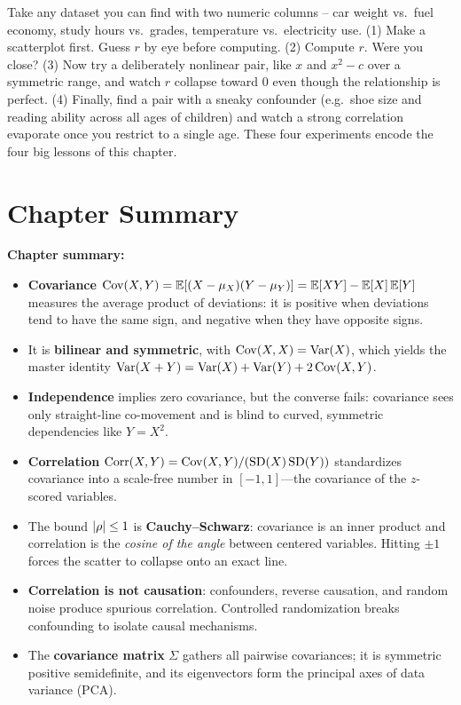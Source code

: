 \begin{labbox}
Take any dataset you can find with two numeric columns -- car weight vs.\ fuel
economy, study hours vs.\ grades, temperature vs.\ electricity use. (1) Make a
scatterplot first. Guess $r$ by eye before computing. (2) Compute $r$. Were you
close? (3) Now try a deliberately nonlinear pair, like $x$ and $x^2 - c$ over
a symmetric range, and watch $r$ collapse toward $0$ even though the relationship is
perfect. (4) Finally, find a pair with a sneaky confounder (e.g.\ shoe size and
reading ability across all ages of children) and watch a strong correlation
evaporate once you restrict to a single age. These four experiments encode the four
big lessons of this chapter.
\end{labbox}

\section{Chapter Summary}
\label{ch14:summary}

\begin{recoverybox}
\textbf{Chapter summary:}
\begin{itemize}
\item \textbf{Covariance} $\operatorname{Cov}(X,Y) = \operatorname{\mathbb{E}}[(X-\mu_X)(Y-\mu_Y)] = \operatorname{\mathbb{E}}[XY] - \operatorname{\mathbb{E}}[X]\operatorname{\mathbb{E}}[Y]$ measures the average product of deviations: it is positive when deviations tend to have the same sign, and negative when they have opposite signs.
\item It is \textbf{bilinear and symmetric}, with $\operatorname{Cov}(X,X) = \operatorname{Var}(X)$, which yields the master identity $\operatorname{Var}(X+Y) = \operatorname{Var}(X) + \operatorname{Var}(Y) + 2\operatorname{Cov}(X,Y)$.
\item \textbf{Independence} implies zero covariance, but the converse fails: covariance sees only straight-line co-movement and is blind to curved, symmetric dependencies like $Y = X^2$.
\item \textbf{Correlation} $\operatorname{Corr}(X,Y) = \operatorname{Cov}(X,Y)/(\operatorname{SD}(X)\operatorname{SD}(Y))$ standardizes covariance into a scale-free number in $[-1,1]$---the covariance of the $z$-scored variables.
\item The bound $\lvert\rho\rvert\le 1$ is \textbf{Cauchy--Schwarz}: covariance is an inner product and correlation is the \emph{cosine of the angle} between centered variables. Hitting $\pm 1$ forces the scatter to collapse onto an exact line.
\item \textbf{Correlation is not causation}: confounders, reverse causation, and random noise produce spurious correlation. Controlled randomization breaks confounding to isolate causal mechanisms.
\item The \textbf{covariance matrix} $\Sigma$ gathers all pairwise covariances; it is symmetric positive semidefinite, and its eigenvectors form the principal axes of data variance (PCA).
\end{itemize}
\end{recoverybox}

